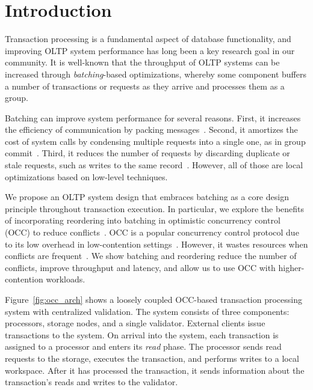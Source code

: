 \section{Introduction}\label{sec:intro}

Transaction processing is a fundamental aspect of database functionality, and improving OLTP system performance has long been a key research goal in our community. It is well-known that the throughput of OLTP systems can be increased through \emph{batching}-based optimizations, whereby some component buffers a number of transactions or requests as they arrive and processes them as a group.

Batching can improve system performance for several reasons. First, it increases the efficiency of communication by packing messages~\cite{ding2015centiman,friedman1997packing}. Second, it amortizes the cost of system calls by condensing multiple requests into a single one, as in group commit~\cite{debrabant2013anti,hagmann1987reimplementing}. Third, it reduces the number of requests by discarding duplicate or stale requests, such as writes to the same record~\cite{faleiro2014lazy}. However, all of those are local optimizations based on low-level techniques.

We propose an OLTP system design that embraces batching as a core design
principle throughout transaction execution.  In particular, we explore the
benefits of incorporating reordering into batching in optimistic concurrency control (OCC) to reduce conflicts~\cite{kung81tods}. OCC is a popular concurrency control protocol due to its low overhead in low-contention
settings~\cite{adya97podc, baker11cidr, bernstein2015optimizing,bernstein11cidr,
bernstein11vldb, corbett12osdi,warp, patterson12vldb,peng10osdi}. However, it
wastes resources when conflicts are frequent~\cite{agrawal1987concurrency}. We
show batching and reordering reduce the number of conflicts, improve
throughput and latency, and allow us to use OCC with higher-contention workloads.


Figure~\ref{fig:occ_arch} shows a loosely coupled OCC-based transaction processing system with centralized validation. The system consists of three components: processors, storage nodes, and a single validator. External clients issue transactions to the system. On arrival into the system, each transaction is assigned to a processor and enters its \emph{read} phase. The processor sends read requests to the storage, executes the transaction, and performs writes to a local workspace. After it has processed the transaction, it sends information about the transaction's reads and writes to the validator. 

